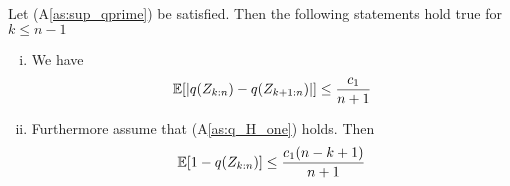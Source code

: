 %
\begin{lemma}
	Let (A\ref{as:sup_qprime}) be satisfied. Then the following statements hold true for $k\leq n-1$
	\begin{enumerate}[(i)]
		\item We have
		\begin{equation}
			\mathbb{E}[|q(Z_{k:n})-q(Z_{k+1:n})|] \leq \frac{c_1}{n+1}
			\label{eq:q_spacings_a}
		\end{equation}
		\item Furthermore assume that (A\ref{as:q_H_one}) holds. Then
		\begin{equation}
			\mathbb{E}[1-q(Z_{k:n})] \leq \frac{c_1(n-k+1)}{n+1}
			\label{eq:q_spacings_lastk}
		\end{equation}
	\end{enumerate}
	\label{lem:q_spacings}
	

\end{lemma}
